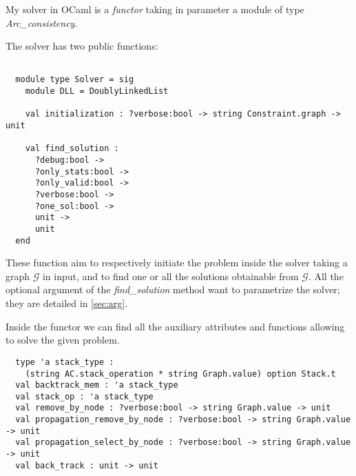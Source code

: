 \documentclass{rapport}
\begin{document}
My solver in OCaml is a \textit{functor} taking in parameter a module of type \textit{Arc\_consistency}.

The solver has two public functions:
\begin{verbatim}

  module type Solver = sig
    module DLL = DoublyLinkedList

    val initialization : ?verbose:bool -> string Constraint.graph -> unit

    val find_solution :
      ?debug:bool ->
      ?only_stats:bool ->
      ?only_valid:bool ->
      ?verbose:bool ->
      ?one_sol:bool ->
      unit ->
      unit
  end

\end{verbatim}

These function aim to respectively initiate the problem inside the solver taking a graph $\mathcal{G}$ in input, and to find one or all the solutions obtainable from $\mathcal{G}$. All the optional argument of the \textit{find\_solution} method want to parametrize the solver; they are detailed in \cref{sec:arg}.

Inside the functor we can find all the auxiliary attributes and functions allowing to solve the given problem.

\begin{verbatim}
  type 'a stack_type :
    (string AC.stack_operation * string Graph.value) option Stack.t
  val backtrack_mem : 'a stack_type 
  val stack_op : 'a stack_type
  val remove_by_node : ?verbose:bool -> string Graph.value -> unit
  val propagation_remove_by_node : ?verbose:bool -> string Graph.value -> unit
  val propagation_select_by_node : ?verbose:bool -> string Graph.value -> unit
  val back_track : unit -> unit
\end{verbatim}
\end{document}
